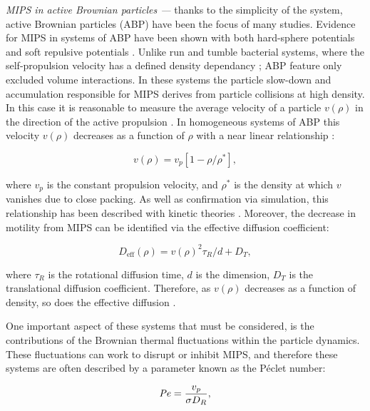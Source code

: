 \textit{MIPS in active Brownian particles ---} thanks to the simplicity of the system, active Brownian particles (ABP) have been the focus of many studies. Evidence for MIPS in systems of ABP have been shown with both hard-sphere potentials \cite{redner2013,bialke2013,stenhammar2013} and soft repulsive potentials \cite{fily2012,fily2014}. Unlike run and tumble bacterial systems, where the self-propulsion velocity has a defined density dependancy \cite{tailleur2008}; ABP  feature only excluded volume interactions. In these systems the particle slow-down and accumulation responsible for MIPS derives from particle collisions at high density. In this case it is reasonable to measure the average velocity of a particle $v (\rho)$ in the direction of the active propulsion \cite{cates2015}. In homogeneous systems of ABP this velocity $v(\rho)$ decreases as a function of $\rho$ with a near linear relationship \cite{fily2012,redner2013,stenhammar2014}:

\begin{equation}
	v(\rho)=v_{p}\left[1-\rho / \rho^{*}\right],
\end{equation}

\noindent where $v_p$ is the constant propulsion velocity, and $\rho^*$ is the density at which $v$ vanishes due to close packing. As well as confirmation via simulation, this relationship has been described with kinetic theories \cite{fily2012,fily2014,stenhammar2013}. Moreover, the decrease in motility from MIPS can be identified via the effective diffusion coefficient:

\begin{equation}
	D_{\textrm{eff}}(\rho)=v(\rho)^{2} \tau_R / d+D_{T},
\end{equation}

\noindent where $\tau_R$ is the rotational diffusion time, $d$ is the dimension, $D_T$ is the translational diffusion coefficient. Therefore, as $v(\rho)$  decreases as a function of density, so does the effective diffusion \cite{fily2012,fily2014,stenhammar2014}.


One important aspect of these systems that must be considered, is the contributions of the Brownian thermal fluctuations within the particle dynamics. These fluctuations can work to disrupt or inhibit MIPS, and therefore these systems are often described by a parameter known as the Péclet number: 

\begin{equation}
	\operatorname{\mathit{P\kern-.08em e}} = \frac{v_p}{\sigma D_R},
	\label{eq:pe}
\end{equation} 
 
